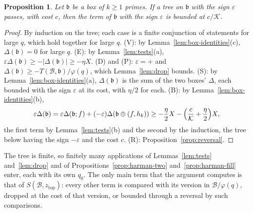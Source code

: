 \documentclass[11pt]{article}
\newtheorem{proposition}[theorem]{Proposition}
\theoremstyle{definition}
\begin{document}
\begin{proposition}\label{prop:tree-bound}
Let $\mathfrak b$ be a box of $k \ge 1$ primes. If a tree on $\mathfrak b$ with the sign $\varepsilon$ passes, with cost
$c$, then the term of $\mathfrak b$ with the sign $\varepsilon$ is bounded at $c/\mathcal K$.
\end{proposition}

\begin{proof}
By induction on the tree; each case is a finite conjunction of statements for large $q$, which hold together for large
$q$. (V): by Lemma~\ref{lem:box-identities}(c), $\Delta(\mathfrak b) = 0$ for large $q$. (E): by
Lemma~\ref{lem:tests}(a),
$\varepsilon\Delta(\mathfrak b) \ge -|\Delta(\mathfrak b)| \ge -\eta X$. (D) and (P): $\varepsilon = +$ and
$\Delta(\mathfrak b) \ge -T(\mathcal B, \mathfrak b)/\varphi(q)$, which Lemma~\ref{lem:drop} bounds. (S): by
Lemma~\ref{lem:box-identities}(a), $\Delta(\mathfrak b)$ is the sum of the two boxes' $\Delta$, each bounded with the
sign $\varepsilon$ at its cost, with $\eta/2$ for each. (B): by Lemma~\ref{lem:box-identities}(b),
\[
  \varepsilon\Delta(\mathfrak b) = \varepsilon\Delta(\mathfrak b; f) + (-\varepsilon)\Delta(\mathfrak b \oplus (f, h_k))
  \ge -\frac\eta2 X - \Bigl(\frac c{\mathcal K} + \frac\eta2\Bigr) X,
\]
the first term by Lemma~\ref{lem:tests}(b) and the second by the induction, the tree below having the sign
$-\varepsilon$
and the cost $c$. (R): Proposition~\ref{prop:reversal}.
\end{proof}

The tree is finite, so finitely many applications of Lemmas~\ref{lem:tests} and~\ref{lem:drop} and of
Propositions~\ref{prop:harman-two} and~\ref{prop:harman-fill} enter, each with its own $q_0$. The only main term that
the argument computes is that of $S(\mathcal B, z_{\mathrm{top}})$: every other term is compared with its version in
$\mathcal B/\varphi(q)$, dropped at the cost of that version, or bounded through a reversal by such comparisons.
\end{document}
